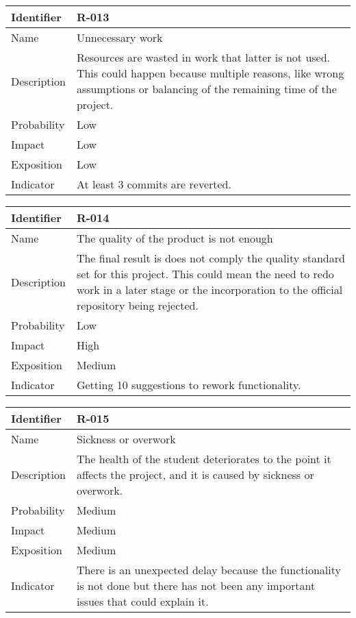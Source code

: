 \begin{table}[H]
	\begin{tabularx}{\textwidth}{|l|X|}
		\hline
		\rowcolor{gray!30}
		Identifier & \textbf{R-013} \\ \hline
		Name & Unnecessary work\\ \hline
		Description & Resources are wasted in work that latter is not used. This could happen because multiple reasons, like wrong assumptions or balancing of the remaining time of the project.\\ \hline
		Probability & Low\\ \hline
		Impact &  Low\\ \hline
		Exposition &  Low\\ \hline
		Indicator & At least 3 commits are reverted.\\ \hline
	\end{tabularx}
\end{table}
\begin{table}[H]
	\begin{tabularx}{\textwidth}{|l|X|}
		\hline
		\rowcolor{gray!30}
		Identifier & \textbf{R-014} \\ \hline
		Name & The quality of the product is not enough\\ \hline
		Description & The final result is does not comply the quality standard set for this project. This could mean the need to redo work in a later stage or the incorporation to the official repository being rejected.\\ \hline
		Probability & Low\\ \hline
		Impact &  High\\ \hline
		Exposition &  Medium\\ \hline
		Indicator & Getting 10 suggestions to rework functionality.\\ \hline
	\end{tabularx}
\end{table}
\begin{table}[H]
	\begin{tabularx}{\textwidth}{|l|X|}
		\hline
		\rowcolor{gray!30}
		Identifier & \textbf{R-015} \\ \hline
		Name & Sickness or overwork\\ \hline
		Description & The health of the student deteriorates to the point it affects the project, and it is caused by sickness or overwork.\\ \hline
		Probability & Medium\\ \hline
		Impact &  Medium\\ \hline
		Exposition &  Medium\\ \hline
		Indicator & There is an unexpected delay because the functionality is not done but there has not been any important issues that could explain it. \\ \hline
	\end{tabularx}
\end{table}
